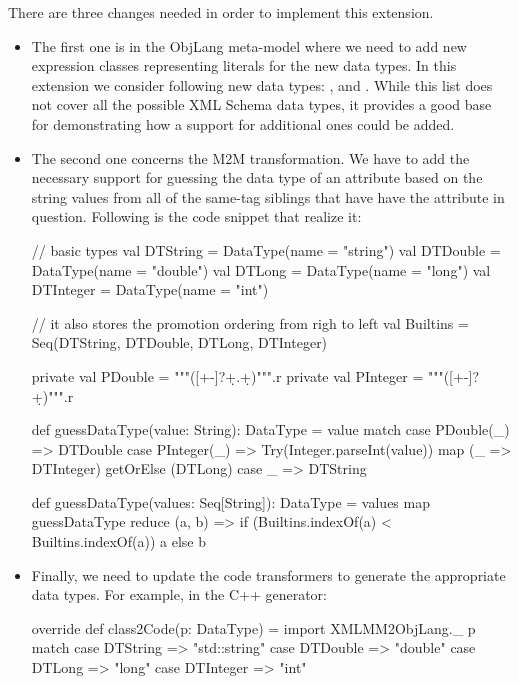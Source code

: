 There are three changes needed in order to implement this extension.
\begin{itemize}[(1)]
	\item The first one is in the ObjLang meta-model where we need to add new expression classes representing literals for the new data types.
	In this extension we consider following new data types: ,  and .
	While this list does not cover all the possible XML Schema data types, it provides a good base for demonstrating how a support for additional ones could be added.

	\item The second one concerns the M2M transformation.
	We have to add the necessary support for guessing the data type of an attribute based on the string values from all of the same-tag siblings that have have the attribute in question.
	Following is the code snippet that realize it:
	\begin{scalacode}
	  // basic types
	  val DTString = DataType(name = "string")
	  val DTDouble = DataType(name = "double")
	  val DTLong = DataType(name = "long")
	  val DTInteger = DataType(name = "int")

	  // it also stores the promotion ordering from righ to left
	  val Builtins = Seq(DTString, DTDouble, DTLong, DTInteger)

	  private val PDouble = """([+-]?\d+.\d+)""".r
	  private val PInteger = """([+-]?\d+)""".r

	  def guessDataType(value: String): DataType = value match {
	    case PDouble(_) => DTDouble
	    case PInteger(_) => Try(Integer.parseInt(value)) map (_ => DTInteger) getOrElse (DTLong)
	    case _ => DTString
	  }

	  def guessDataType(values: Seq[String]): DataType =
	    values map guessDataType reduce { (a, b) =>
	      if (Builtins.indexOf(a) < Builtins.indexOf(a)) a else b
	    }
	\end{scalacode}

	\item Finally, we need to update the code transformers to generate the appropriate data types.
	For example, in the C++ generator:
	\begin{scalacode}
override def class2Code(p: DataType) = {
  import XMLMM2ObjLang._
  p match {
    case DTString => "std::string"
    case DTDouble => "double"
    case DTLong => "long"
    case DTInteger => "int"
  }
}		
	\end{scalacode}
\end{itemize}

